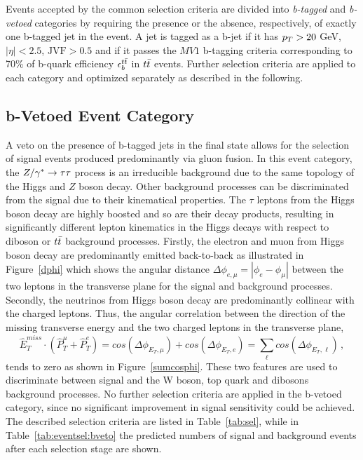 Events accepted by the common selection criteria are divided into \emph{b-tagged} and \emph{b-vetoed}  categories by requiring the presence 
or the absence, respectively, of exactly one b-tagged jet  in the event. A jet is tagged  as a b-jet if  it has 
$p_{T} > 20$ GeV, $|\eta| < 2.5$, $\text{JVF} > 0.5$ and if it passes  the $MV1$ b-tagging criteria corresponding to 
70\% of b-quark efficiency $\epsilon_b^{t\bar{t}}$ in $t\bar{t}$ events. Further selection criteria
are applied to each category and optimized separately as described in the following.

\subsection{b-Vetoed Event Category}\label{sec:veto}

A veto on the presence of b-tagged jets in the final state allows for the selection of signal events
produced predominantly via gluon fusion. In this event category, the 
$Z/\gamma^*\rightarrow \tau\tau$  process is an irreducible background due to the same topology of the Higgs and $Z$ boson decay.
Other background processes can  be discriminated from the signal due to their kinematical properties.
The $\tau$ leptons from the Higgs boson decay are highly boosted and so are their decay products, resulting
in significantly different lepton kinematics in the Higgs decays with respect to  diboson or $t\bar{t}$ background processes. 
Firstly, the electron and muon from Higgs boson decay are predominantly 
emitted back-to-back as illustrated in Figure~\ref{dphi} which shows
the angular distance $\Delta\phi_{e,\mu} = |\phi_{e} - \phi_{\mu}|$  between the two leptons in the transverse plane 
for the signal and background processes. Secondly, the neutrinos from Higgs boson decay  are predominantly
collinear with the charged leptons. Thus, the angular correlation between the direction of the missing transverse energy 
and the two charged leptons in the transverse plane, 
$$ \hat{E}_{T}^{miss} \cdot ( \hat{P}_{T}^{\mu} + \hat{P}_{T}^{e} ) = cos(\Delta\phi_{E_{T},\mu}) 
+ cos(\Delta\phi_{E_{T},e}) = \sum_\ell cos(\Delta\phi_{E_{T},\ell}) \,,$$
tends to zero as shown in Figure~\ref{sumcosphi}. 
These two features are used to discriminate between  signal and the W boson, top quark and  dibosons background processes.
No further selection criteria are applied in the b-vetoed category, since  no significant improvement
in signal sensitivity could be achieved.
The described selection criteria are listed in Table~\ref{tab:sel}, while in Table~\ref{tab:eventsel:bveto}
the predicted numbers of signal and background events after each selection stage  are shown.


